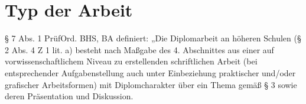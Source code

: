 \documentclass[11pt]{article}
\begin{document}
\section{Typ der Arbeit}
§ 7 Abs. 1 PrüfOrd. BHS, BA definiert: „Die Diplomarbeit an höheren Schulen (§ 2 Abs. 4 Z 1 lit. a)
besteht nach Maßgabe des 4. Abschnittes aus einer auf vorwissenschaftlichem Niveau zu erstellenden
schriftlichen Arbeit (bei entsprechender Aufgabenstellung auch unter Einbeziehung praktischer und/oder
grafischer Arbeitsformen) mit Diplomcharakter über ein Thema gemäß § 3 sowie deren Präsentation und
Diskussion.
\end{document}

